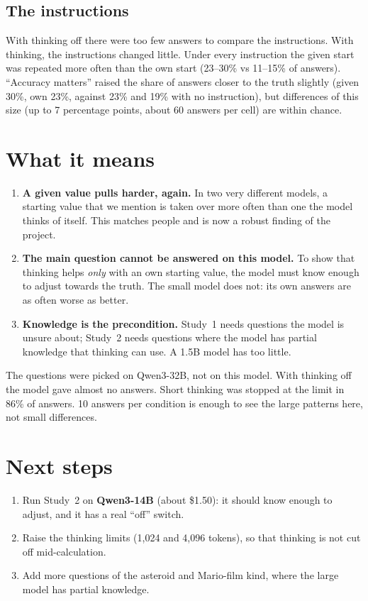 \documentclass[11pt,a4paper]{article}
\begin{document}
\subsection{The instructions}
With thinking off there were too few answers to compare the instructions. With thinking, the instructions changed little. Under every instruction the given start was repeated more often than the own start (23--30\% vs 11--15\% of answers). \enquote{Accuracy matters} raised the share of answers closer to the truth slightly (given 30\%, own 23\%, against 23\% and 19\% with no instruction), but differences of this size (up to 7 percentage points, about 60 answers per cell) are within chance.

\section{What it means}

\begin{enumerate}[leftmargin=*]
  \item \textbf{A given value pulls harder, again.} In two very different models, a starting value that we mention is taken over more often than one the model thinks of itself. This matches people \citep{epley2001putting} and is now a robust finding of the project.
  \item \textbf{The main question cannot be answered on this model.} To show that thinking helps \emph{only} with an own starting value, the model must know enough to adjust towards the truth. The small model does not: its own answers are as often worse as better.
  \item \textbf{Knowledge is the precondition.} Study~1 needs questions the model is unsure about; Study~2 needs questions where the model has partial knowledge that thinking can use. A 1.5B model has too little.
\end{enumerate}

\begin{cautionbox}[Limits.]
The questions were picked on Qwen3-32B, not on this model. With thinking off the model gave almost no answers. Short thinking was stopped at the limit in 86\% of answers. 10 answers per condition is enough to see the large patterns here, not small differences.
\end{cautionbox}

\section{Next steps}
\begin{enumerate}[leftmargin=*]
  \item Run Study~2 on \textbf{Qwen3-14B} (about \$1.50): it should know enough to adjust, and it has a real \enquote{off} switch.
  \item Raise the thinking limits (1,024 and 4,096 tokens), so that thinking is not cut off mid-calculation.
  \item Add more questions of the asteroid and Mario-film kind, where the large model has partial knowledge.
\end{enumerate}
\end{document}
